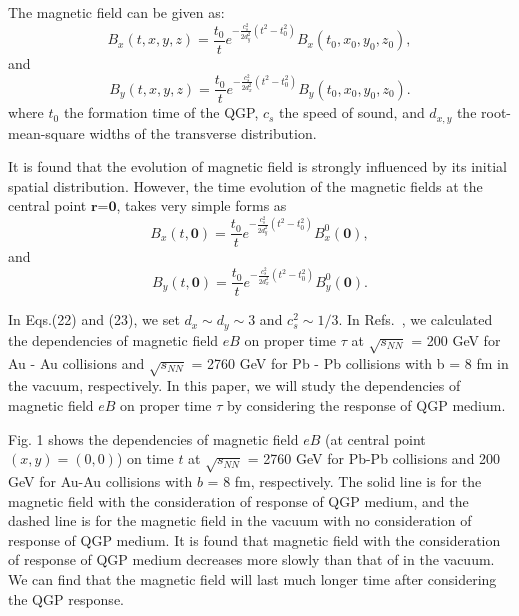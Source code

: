 \documentclass[twocolumn,showpacs,preprintnumbers,amsmath,amssymb]{revtex4}
\begin{document}
The magnetic field can be given as:
\begin{equation}
B_{x}(t,x,y,z)=\frac{t_{0}}{t}e^{-\frac{c_{s}^{2}}{2d_{y}^{2}}(t^{2}-t_{0}^{2})}B_{x}(t_{0},x_{0},y_{0},z_{0}),
\label{eq:eq20} %
\end{equation}
and
\begin{equation}
B_{y}(t,x,y,z)=\frac{t_{0}}{t}e^{-\frac{c_{s}^{2}}{2d_{x}^{2}}(t^{2}-t_{0}^{2})}B_{y}(t_{0},x_{0},y_{0},z_{0}).
\label{eq:eq21} %
\end{equation}
where $t_{0}$ the formation time of the QGP, $c_{s}$
the speed of sound, and $d_{x,y}$ the root-mean-square widths of the transverse distribution.   

It is found that the evolution of magnetic field is strongly influenced by its initial spatial distribution.
However, the time evolution of the magnetic fields at the central point $\textbf{r=0}$, takes very simple forms as
\begin{equation}
B_{x}(t,\mathbf{0})=\frac{t_{0}}{t}e^{-\frac{c_{s}^{2}}{2d_{y}^{2}}(t^{2}-t_{0}^{2})}B_{x}^{0}(\mathbf{0}),
\label{eq:eq22} %
\end{equation}
and
\begin{equation}
B_{y}(t,\mathbf{0})=\frac{t_{0}}{t}e^{-\frac{c_{s}^{2}}{2d_{x}^{2}}(t^{2}-t_{0}^{2})}B_{y}^{0}(\mathbf{0}).
\label{eq:eq23} %
\end{equation}

In Eqs.(22) and (23), we set $d_{x}\sim d_{y}\sim3$ and $c_{s}^{2}\sim1/3$. In Refs.~\cite{lab14,lab15}, we calculated the dependencies of magnetic field $eB$
on proper time $\tau$ at $\sqrt{s_{NN}}$ = 200 GeV for Au - Au collisions  and  $\sqrt{s_{NN}}$ = 2760 GeV for Pb - Pb collisions with b = 8 fm in the vacuum, respectively.
In this paper, we will study the dependencies of magnetic field $eB$ on proper time $\tau$ by considering the response of QGP medium.

Fig. 1 shows the dependencies of magnetic field $eB$ (at central point $(x, y) = (0, 0)$) on  time $t$ at $\sqrt{s_{NN}}$ = 2760 GeV for Pb-Pb collisions and 200 GeV for Au-Au
collisions with $b$ = 8 fm, respectively. The solid line is for the magnetic field with the consideration of response of QGP medium, and the dashed line is for the magnetic field in the vacuum with no consideration
of response of QGP medium. It is found that magnetic field with the consideration of response of QGP medium decreases more slowly than that of in the vacuum. We can find that
the magnetic field will last much longer time after considering the QGP response.
\end{document}
